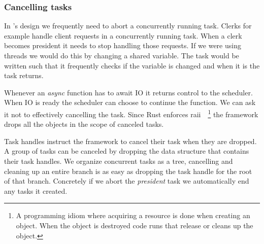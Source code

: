 \subsubsection*{Cancelling tasks}
In \name's design we frequently need to abort a concurrently running task. Clerks for example handle client requests in a concurrently running task. When a clerk becomes president it needs to stop handling those requests. If we were using threads we would do this by changing a shared variable. The task would be written such that it frequently checks if the variable is changed and when it is the task returns. 

Whenever an \textit{async} function has to await IO it returns control to the scheduler. When IO is ready the scheduler can choose to continue the function. We can ask it not to effectively cancelling the task. Since Rust enforces \acf{raii}~\cite[p.~389]{raii}~\footnote{A programming idiom where acquiring a resource is done when creating an object. When the object is destroyed code runs that release or cleans up the object.} the framework drops all the objects in the scope of canceled tasks. 

Task handles instruct the framework to cancel their task when they are dropped. A group of tasks can be canceled by dropping the data structure that contains their task handles. We organize concurrent tasks as a tree, cancelling and cleaning up an entire branch is as easy as dropping the task handle for the root of that branch. Concretely if we abort the \textsl{president} task we automatically end any tasks it created.

